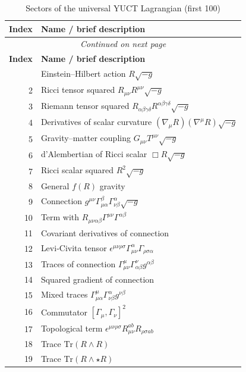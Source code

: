 \documentclass[12pt,a4paper]{article}
\begin{document}
	\begin{longtable}{r l}
		\caption{Sectors of the universal YUCT Lagrangian (first 100)}\label{tab:sectors}\\
		\toprule
		\textbf{Index} & \textbf{Name / brief description} \\
		\midrule
		\endfirsthead
		\multicolumn{2}{c}{\textit{Continued on next page}}\\
		\toprule
		\textbf{Index} & \textbf{Name / brief description} \\
		\midrule
		\endhead
		\bottomrule
		\endfoot
		1 & Einstein–Hilbert action \(R\sqrt{-g}\) \\
		2 & Ricci tensor squared \(R_{\mu\nu}R^{\mu\nu}\sqrt{-g}\) \\
		3 & Riemann tensor squared \(R_{\alpha\beta\gamma\delta}R^{\alpha\beta\gamma\delta}\sqrt{-g}\) \\
		4 & Derivatives of scalar curvature \((\nabla_\mu R)(\nabla^\mu R)\sqrt{-g}\) \\
		5 & Gravity–matter coupling \(G_{\mu\nu}T^{\mu\nu}\sqrt{-g}\) \\
		6 & d'Alembertian of Ricci scalar \(\Box R\sqrt{-g}\) \\
		7 & Ricci scalar squared \(R^2\sqrt{-g}\) \\
		8 & General \(f(R)\) gravity \\
		9 & Connection \(g^{\mu\nu}\Gamma^{\beta}_{\mu\alpha}\Gamma^{\alpha}_{\nu\beta}\sqrt{-g}\) \\
		10 & Term with \(R_{\mu\nu\alpha\beta}\Gamma^{\mu\nu}\Gamma^{\alpha\beta}\) \\
		11 & Covariant derivatives of connection \\
		12 & Levi‑Civita tensor \(\epsilon^{\mu\nu\rho\sigma}\Gamma^{\alpha}_{\mu\nu}\Gamma_{\rho\sigma\alpha}\) \\
		13 & Traces of connection \(\Gamma^{\mu}_{\mu\nu}\Gamma^{\nu}_{\alpha\beta}g^{\alpha\beta}\) \\
		14 & Squared gradient of connection \\
		15 & Mixed traces \(\Gamma^{\mu}_{\mu\alpha}\Gamma^{\alpha}_{\nu\beta}g^{\nu\beta}\) \\
		16 & Commutator \([\Gamma_\mu, \Gamma_\nu]^2\) \\
		17 & Topological term \(\epsilon^{\mu\nu\rho\sigma}R_{\mu\nu}^{ab}R_{\rho\sigma ab}\) \\
		18 & Trace \(\mathrm{Tr}(R\wedge R)\) \\
		19 & Trace \(\mathrm{Tr}(R\wedge\star R)\) \\

\end{longtable}
\end{document}
